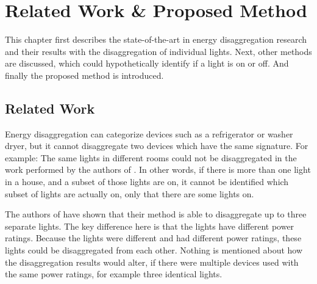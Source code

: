 
\chapter{Related Work \& Proposed Method}
\label{chp:related-work}


















This chapter first describes the state-of-the-art in energy disaggregation research and their results with the disaggregation of individual lights.
Next, other methods are discussed, which could hypothetically identify if a light is on or off.
And finally the proposed method is introduced.


	\section{Related Work}

		Energy disaggregation can categorize devices such as a refrigerator or washer dryer, but it cannot disaggregate two devices which have the same signature.
		For example: The same lights in different rooms could not be disaggregated in the work performed by the authors of \cite{froehlich2011disaggregated}.
		In other words, if there is more than one light in a house, and a subset of those lights are on, it cannot be identified which subset of lights are actually on, only that there are some lights on.


		The authors of \cite{shao2013temporal} have shown that their method is able to disaggregate up to three separate lights.
		The key difference here is that the lights have different power ratings.
		Because the lights were different and had different power ratings, these lights could be disaggregated from each other.
		Nothing is mentioned about how the disaggregation results would alter, if there were multiple devices used with the same power ratings, for example three identical lights.



